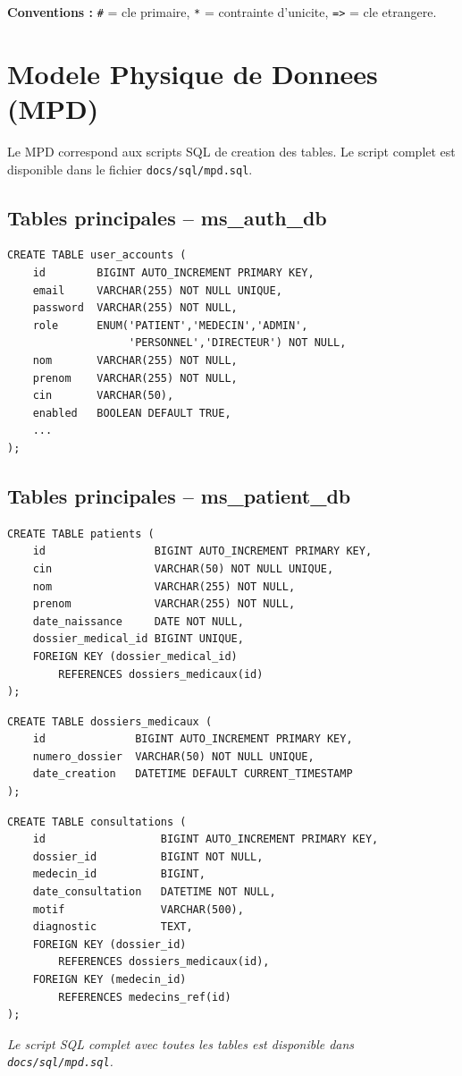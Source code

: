 \textbf{Conventions :} \texttt{\#} = cle primaire, \texttt{*} = contrainte d'unicite, \texttt{=>} = cle etrangere.

\section{Modele Physique de Donnees (MPD)}

Le MPD correspond aux scripts SQL de creation des tables. Le script complet est
disponible dans le fichier \texttt{docs/sql/mpd.sql}.

\subsection{Tables principales -- ms\_auth\_db}

\begin{lstlisting}[caption=Table user\_accounts]
CREATE TABLE user_accounts (
    id        BIGINT AUTO_INCREMENT PRIMARY KEY,
    email     VARCHAR(255) NOT NULL UNIQUE,
    password  VARCHAR(255) NOT NULL,
    role      ENUM('PATIENT','MEDECIN','ADMIN',
                   'PERSONNEL','DIRECTEUR') NOT NULL,
    nom       VARCHAR(255) NOT NULL,
    prenom    VARCHAR(255) NOT NULL,
    cin       VARCHAR(50),
    enabled   BOOLEAN DEFAULT TRUE,
    ...
);
\end{lstlisting}

\subsection{Tables principales -- ms\_patient\_db}

\begin{lstlisting}[caption=Table patients]
CREATE TABLE patients (
    id                 BIGINT AUTO_INCREMENT PRIMARY KEY,
    cin                VARCHAR(50) NOT NULL UNIQUE,
    nom                VARCHAR(255) NOT NULL,
    prenom             VARCHAR(255) NOT NULL,
    date_naissance     DATE NOT NULL,
    dossier_medical_id BIGINT UNIQUE,
    FOREIGN KEY (dossier_medical_id)
        REFERENCES dossiers_medicaux(id)
);
\end{lstlisting}

\begin{lstlisting}[caption=Table dossiers\_medicaux]
CREATE TABLE dossiers_medicaux (
    id              BIGINT AUTO_INCREMENT PRIMARY KEY,
    numero_dossier  VARCHAR(50) NOT NULL UNIQUE,
    date_creation   DATETIME DEFAULT CURRENT_TIMESTAMP
);
\end{lstlisting}

\begin{lstlisting}[caption=Table consultations]
CREATE TABLE consultations (
    id                  BIGINT AUTO_INCREMENT PRIMARY KEY,
    dossier_id          BIGINT NOT NULL,
    medecin_id          BIGINT,
    date_consultation   DATETIME NOT NULL,
    motif               VARCHAR(500),
    diagnostic          TEXT,
    FOREIGN KEY (dossier_id)
        REFERENCES dossiers_medicaux(id),
    FOREIGN KEY (medecin_id)
        REFERENCES medecins_ref(id)
);
\end{lstlisting}

\textit{Le script SQL complet avec toutes les tables est disponible dans \texttt{docs/sql/mpd.sql}.}
